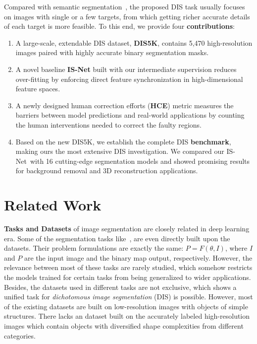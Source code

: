 Compared with semantic segmentation~\cite{everingham2010pascal,lin2014microsoft,Cordts2016Cityscapes,zhou2017scene,qi2021open}, the proposed DIS task usually focuses on images with single or a few targets, from which getting richer accurate details of each target is more feasible. To this end, we provide four \textbf{contributions}:

\begin{enumerate}

    \item A large-scale, extendable DIS dataset, \textbf{DIS5K}, contains 5,470 high-resolution images paired with highly accurate binary segmentation masks.

    \item 
    A novel baseline \textbf{IS-Net} built with our intermediate supervision reduces over-fitting by enforcing direct feature synchronization in high-dimensional feature spaces.

    \item 
    A newly designed human correction efforts (\textbf{HCE}) metric measures the barriers between model predictions and real-world applications by counting the human interventions needed to correct the faulty regions.

    \item Based on the new DIS5K, we establish the complete DIS \textbf{benchmark}, making ours the most extensive DIS investigation. We compared our IS-Net~with 16 cutting-edge segmentation models and showed promising results for background removal and 3D reconstruction applications.
\end{enumerate}

\section{Related Work}\label{sec:RelatedWork}

\textbf{Tasks and Datasets} of image segmentation are closely related in deep learning era. Some of the segmentation tasks like~\cite{DBLP:journals/pami/ChengMHTH15,wang2017learning,fan2021concealed,liew2021deep,yang2020meticulous,shen2016automatic,DBLP:journals/corr/abs-2108-11515,MnihThesis}, are even directly built upon the datasets. Their problem formulations are exactly the same: $P = F(\theta,I)$, where $I$ and $P$ are the input image and the binary map output, respectively. However, the relevance between most of these tasks are rarely studied, which somehow restricts the models trained for certain tasks from being generalized to wider applications. Besides, the datasets used in different tasks are not exclusive, which shows a unified task for \textit{dichotomous image segmentation} (DIS) is possible. However, most of the existing datasets are built on low-resolution images with objects of simple structures. There lacks an dataset built on the accurately labeled high-resolution images which contain objects with diversified shape complexities from different categories. 

